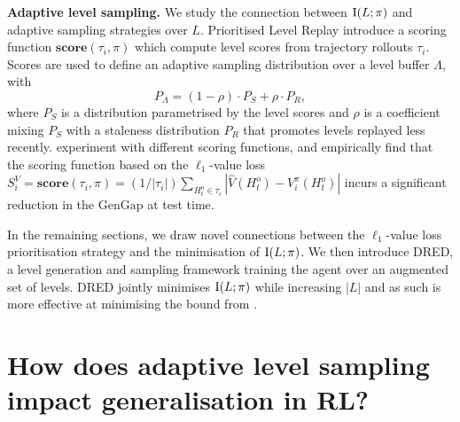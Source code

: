 \documentclass{article}
\theoremstyle{plain}
\theoremstyle{definition}
\theoremstyle{remark}
\begin{document}
\textbf{Adaptive level sampling.} We study the connection between $\text{I}(L;\pi)$ and adaptive sampling strategies over $L$. Prioritised Level Replay \citep[PLR,][]{PLR} introduce a scoring function $\textbf{score}(\tau_i, \pi)$ which compute level scores from trajectory rollouts $\tau_i$. Scores are used to define an adaptive sampling distribution over a level buffer $\Lambda$, with
\begin{equation}\label{eq:plr_buffer_dist}
    P_\Lambda = (1 - \rho) \cdot P_S + \rho \cdot P_R,
\end{equation}
where $P_S$ is a distribution parametrised by the level scores and $\rho$ is a coefficient mixing $P_S$ with a staleness distribution $P_R$ that promotes levels replayed less recently. \citet{PLR} experiment with different scoring functions, and empirically find that the scoring function based on the $\ell_1$-value loss $S^V_i = \textbf{score}(\tau_i, \pi) = (1 / |\tau_i|) \sum_{H_t^o\in\tau_i} |\hat{V} (H_t^o) - V^\pi_i (H_t^o) |$ incurs a significant reduction in the $\text{GenGap}$ at test time. 

In the remaining sections, we draw novel connections between the $\ell_1$-value loss prioritisation strategy and the minimisation of $\text{I}(L;\pi)$. We then introduce DRED, a level generation and sampling framework training the agent over an augmented set of levels. DRED jointly minimises $\text{I}(L;\pi)$ while increasing $|L|$ and as such is more effective at minimising the bound from .
\section{How does adaptive level sampling impact generalisation in RL?} \label{sec:procgen}





\end{document}
